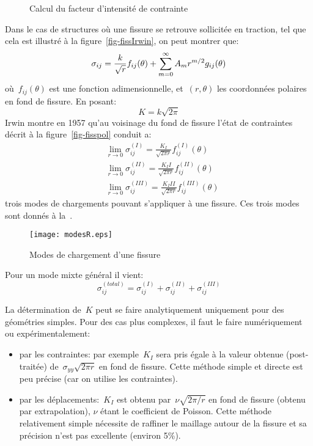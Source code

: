 \begin{figure}[ht]\centering
{}\hspace{6em}
\caption{Calcul du facteur d'intensité de contrainte}
\end{figure}
Dans le cas de structures où une fissure se retrouve sollicitée en traction, tel que cela est illustré à la figure~\ref{fig-fissIrwin}, on peut montrer que:
\begin{equation} \sigma_{ij} = \frac{k}{\sqrt{r}} f_{ij}(\theta) + \displaystyle\sum_{m=0}^\infty A_m r^{m/2} g_{ij}(\theta) \end{equation}
où~$f_{ij}(\theta)$ est une fonction adimensionnelle, et~$(r, \theta)$ les coordonnées polaires en fond de fissure. En posant:
\begin{equation} K = k\sqrt{2\pi} \end{equation}
Irwin montre en 1957 qu'au voisinage du fond de fissure l'état de contraintes décrit à la figure~\ref{fig-fisspol} conduit a:
\begin{align}
&\lim_{r\rightarrow0} \sigma_{ij}^{(I)} = \frac{K_I}{\sqrt{2\pi r}} f_{ij}^{(I)}(\theta) \\
&\lim_{r\rightarrow0} \sigma_{ij}^{(II)} = \frac{K_II}{\sqrt{2\pi r}} f_{ij}^{(II)}(\theta) \\
&\lim_{r\rightarrow0} \sigma_{ij}^{(III)} = \frac{K_III}{\sqrt{2\pi r}} f_{ij}^{(III)}(\theta)
\end{align}
trois modes de chargements pouvant s'appliquer à une fissure. Ces trois modes sont donnés à la~.
\begin{figure}[htb]
\centering\texttt{[image: modesR.eps]}
\caption{Modes de chargement d'une fissure}\label{fig-modesR}
\end{figure}

\medskip
Pour un mode mixte général il vient:
\begin{equation} \sigma_{ij}^{(total)} = \sigma_{ij}^{(I)} + \sigma_{ij}^{(II)} + \sigma_{ij}^{(III)} \end{equation}


\medskip{}
La détermination de~$K$ peut se faire analytiquement uniquement pour des géométries simples. Pour des cas plus complexes, il faut le faire numériquement ou expérimentalement:
\begin{itemize}
\item par les contraintes: par exemple~$K_I$ sera pris égale à la valeur obtenue (post-traitée) de~$\sigma_{yy}\sqrt{2\pi r}$ en fond de fissure. Cette méthode simple et directe est peu précise (car on utilise les contraintes).
\item par les déplacements:~$K_I$ est obtenu par~$\nu \sqrt{2\pi/r}$ en fond de fissure (obtenu par extrapolation), $\nu$ étant le coefficient de Poisson. Cette méthode relativement simple nécessite de raffiner le maillage autour de la fissure et sa précision n'est pas excellente (environ 5\%).
\end{itemize}

